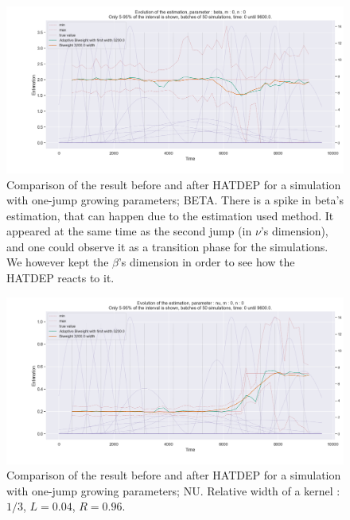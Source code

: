 \begin{figure}
\centering
\includegraphics[width = 0.90 \textwidth]{../imag/chap3/2/2.png}
\caption{Comparison of the result before and after HATDEP for a simulation with one-jump growing parameters; BETA. There is a spike in beta's estimation, that can happen due to the estimation used method. It appeared at the same time as the second jump (in $\nu$'s dimension), and one could observe it as a transition phase for the simulations. We however kept the $\beta$'s dimension in order to see how the HATDEP reacts to it.}
\label{fig:first_estimate_2_beta}
\end{figure}

\begin{figure}
\centering
\includegraphics[width = 0.90 \textwidth]{../imag/chap3/2/3.png}
\caption{Comparison of the result before and after HATDEP for a simulation with one-jump growing parameters; NU. Relative width of a kernel : $1/3$, $L = 0.04$, $R = 0.96$.}
\label{fig:first_estimate_2_nu}
\end{figure}



















